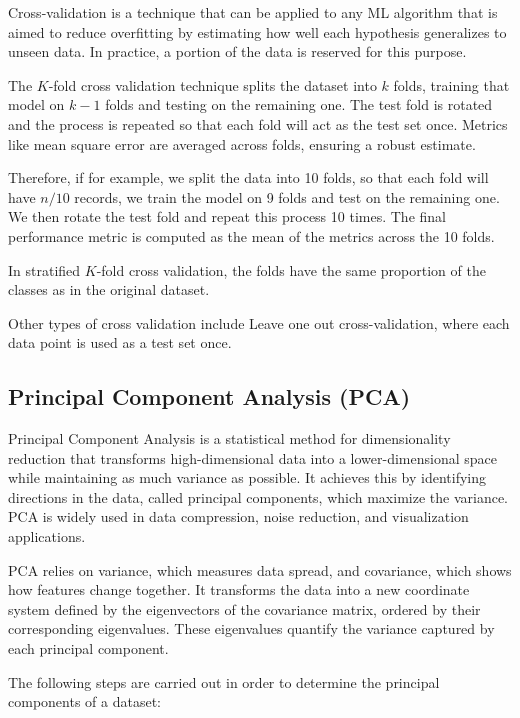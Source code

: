 		Cross-validation is a technique that can be applied to any ML algorithm that is aimed to reduce overfitting by estimating how well each hypothesis generalizes to unseen data. In practice, a portion of the data is reserved for this purpose.
		
		The $K$-fold cross validation technique splits the dataset into $k$ folds, training that model on $k-1$ folds and testing on the remaining one. The test fold is rotated and the process is repeated so that each fold will act as the test set once. Metrics like mean square error are averaged across folds, ensuring a robust estimate.
		
		Therefore, if for example, we split the data into 10 folds, so that each fold will have $n/10$ records, we train the model on 9 folds and test on the remaining one. We then rotate the test fold and repeat this process 10 times. The final performance metric is computed as the mean of the metrics across the 10 folds.
		
		In stratified $K$-fold cross validation, the folds have the same proportion of the classes as in the original dataset.
		
		Other types of cross validation include Leave one out cross-validation, where each data point is used as a test set once.
	
	
	
	\subsection{Principal Component Analysis (PCA)}
	
		Principal Component Analysis is a statistical method for dimensionality reduction that transforms high-dimensional data into a lower-dimensional space while maintaining as much variance as possible. It achieves this by identifying directions in the data, called principal components, which maximize the variance. PCA is widely used in data compression, noise reduction, and visualization applications. 
		
		PCA relies on variance, which measures data spread, and covariance, which shows how features change together. It transforms the data into a new coordinate system defined by the eigenvectors of the covariance matrix, ordered by their corresponding eigenvalues. These eigenvalues quantify the variance captured by each principal component.
		
		The following steps are carried out in order to determine the principal components of a dataset:
		
